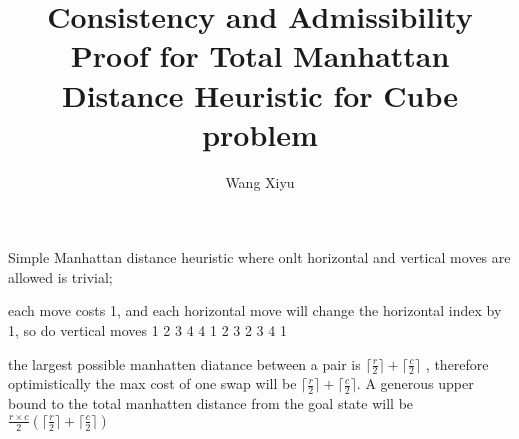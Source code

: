 \documentclass{article}
\begin{document}
\title{Consistency and Admissibility Proof for Total Manhattan Distance Heuristic for Cube problem}
\author{Wang Xiyu}
\date{}
\maketitle
Simple Manhattan distance  heuristic where onlt horizontal and vertical moves are allowed is trivial; 

each move costs 1, and each horizontal move will change the horizontal index by 1, so do vertical moves 
1 2 3 4
4 1 2 3
2 3 4 1 

the largest possible manhatten diatance between a pair is $\lceil\frac{r}{2}\rceil + \lceil\frac{c}{2}\rceil$
, therefore optimistically the max cost of one swap will be $\lceil\frac{r}{2}\rceil + \lceil\frac{c}{2}\rceil$. 
A generous upper bound to the total manhatten distance from the goal state will be 
$\frac{r \times c}{2}(\lceil\frac{r}{2}\rceil + \lceil\frac{c}{2}\rceil)$ 
\end{document}
